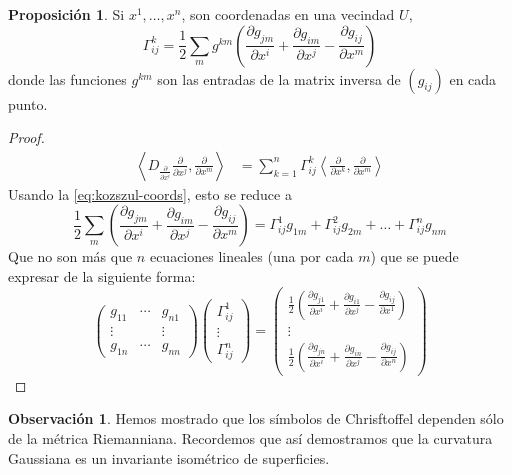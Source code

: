 \documentclass[spanish]{book}
\theoremstyle{definition}
\newtheorem*{prop}{Proposición}
\newtheorem*{obs}{Observación}
\begin{document}
	\begin{prop}
		Si $x^1,\ldots,x^n$, son coordenadas en una vecindad $U$,
		\[\Gamma_{ij}^k = \frac{1}{2} \sum_m g^{km}\left( \frac{\partial g_{jm}}{\partial x^i} + \frac{\partial g_{im}}{\partial x^j} - \frac{\partial g_{ij}}{\partial x^m} \right)\]
		donde las funciones $g^{km}$ son las entradas de la matrix inversa de $(g_{ij})$ en cada punto.
	\end{prop}
	\begin{proof}
		\begin{align*}
			\left\langle D_{\frac{\partial}{\partial x^i}}\frac{\partial}{\partial x^j},\frac{\partial}{\partial x^m}\right\rangle&=\sum_{k=1}^n\Gamma_{ij}^k\left\langle\frac{\partial}{\partial x^k},\frac{\partial}{\partial x^m}\right\rangle
		\end{align*}
		Usando la \cref{eq:kozszul-coords}, esto se reduce a
			\[\frac{1}{2} \sum_m \left( \frac{\partial g_{jm}}{\partial x^i} + \frac{\partial g_{im}}{\partial x^j} - \frac{\partial g_{ij}}{\partial x^m} \right)=\Gamma_{ij}^1g_{1m}+\Gamma^2_{ij}g_{2m}+\ldots+\Gamma_{ij}^ng_{nm}\]
		Que no son más que $n$ ecuaciones lineales (una por cada $m$) que se puede expresar de la siguiente forma:
		\[\begin{pmatrix}
			g_{11}&\cdots&g_{n1}\\
			\vdots&&\vdots\\
			g_{1n}&\cdots&g_{nn}
		\end{pmatrix}\begin{pmatrix}
		\Gamma_{ij}^1\\
		\vdots\\
		\Gamma_{ij}^n
		\end{pmatrix}=\begin{pmatrix}
		\frac{1}{2}\left( \frac{\partial g_{j1}}{\partial x^i} + \frac{\partial g_{i1}}{\partial x^j} - \frac{\partial g_{ij}}{\partial x^1} \right)\\
		\vdots\\
		\frac{1}{2} \left( \frac{\partial g_{jn}}{\partial x^i} + \frac{\partial g_{in}}{\partial x^j} - \frac{\partial g_{ij}}{\partial x^n} \right)
		\end{pmatrix}\]
	\end{proof}
	\begin{obs}
		Hemos mostrado que los símbolos de Chrisftoffel dependen sólo de la métrica Riemanniana. Recordemos que así demostramos que la curvatura Gaussiana es un invariante isométrico de superficies.
	\end{obs}
	
\end{document}

